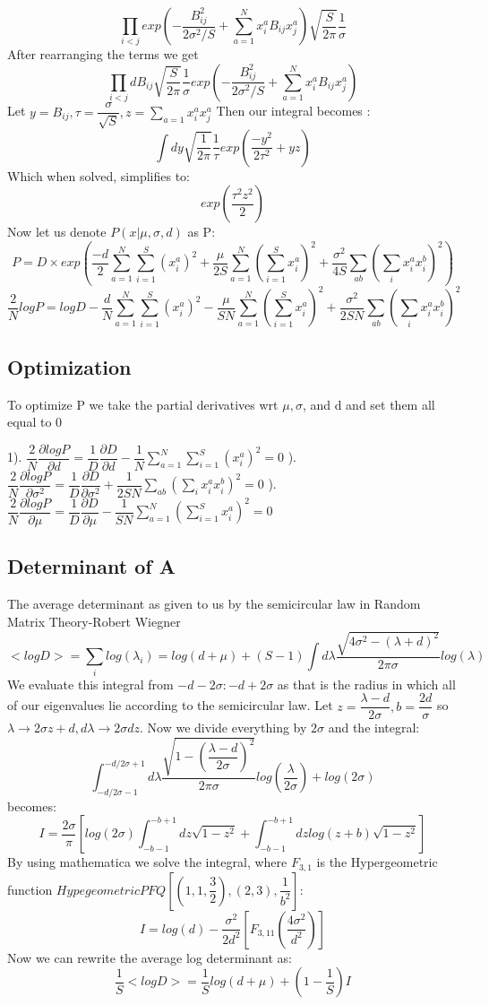 \documentclass{article}
\begin{document}
$$\prod_{i<j} exp(-\dfrac{B_{ij}^2}{2\sigma^2/S}+\sum_{a=1}^N x_i^a B_{ij} x_j^a)\sqrt{\dfrac{S}{2\pi}}\dfrac{1}{\sigma}$$
\hfill\break
After rearranging the terms we get \hfill\break
$$\prod_{i<j} dB_{ij} \sqrt{\dfrac{S}{2\pi}}\dfrac{1}{\sigma}exp(-\dfrac{B_{ij}^2}{2\sigma^2/S}+\sum_{a=1}^N x_i^a B_{ij} x_j^a)$$
Let $y=B_{ij}, \tau=\dfrac{\sigma}{\sqrt{S}}, z=\sum_{a=1} x_i^a x_j^a$
\hfill\break\hfill\break
Then our integral becomes :
$$
\int dy \sqrt{\dfrac{1}{2\pi}}\dfrac{1}{\tau}exp(\dfrac{-y^2}{2\tau ^2}+yz)
$$
Which when solved, simplifies to:
$$
exp(\dfrac{\tau ^2 z^2}{2})
$$
Now let us denote $P(x|\mu,\sigma,d)$ as P:
$$
P=D\times exp(\dfrac{-d}{2}\sum_{a=1}^N\sum_{i=1}^S(x_i^a)^2 + \dfrac{\mu}{2S} \sum_{a=1}^N (\sum_{i=1}^S x_i^a)^2+\dfrac{\sigma^2}{4S}\sum_{ab}(\sum_i x_i^a x_i ^b)^2)
$$
$$
\dfrac{2}{N}logP=logD-\dfrac{d}{N}\sum_{a=1}^N\sum_{i=1}^S(x_i^a)^2 - \dfrac{\mu}{SN} \sum_{a=1}^N (\sum_{i=1}^S x_i^a)^2+\dfrac{\sigma^2}{2SN}\sum_{ab}(\sum_i x_i^a x_i ^b)^2
$$

\subsection{Optimization}
To optimize P we take the partial derivatives wrt $\mu, \sigma$, and d and set them all equal to 0

1). $\dfrac{2}{N}\dfrac{\partial logP}{\partial d}=\dfrac{1}{D}\dfrac{\partial D}{\partial d}-\dfrac{1}{N}\sum_{a=1}^N\sum_{i=1}^S(x_i^a)^2 =0$
\hfill\break\hfill{}). $\dfrac{2}{N}\dfrac{\partial logP}{\partial \sigma^2}=\dfrac{1}{D}\dfrac{\partial D}{\partial \sigma^2}+\dfrac{1}{2SN}\sum_{ab}(\sum_i x_i^a x_i ^b)^2 =0$
\hfill\break\hfill{}). $\dfrac{2}{N}\dfrac{\partial logP}{\partial \mu}=\dfrac{1}{D}\dfrac{\partial D}{\partial \mu}-\dfrac{1}{SN} \sum_{a=1}^N (\sum_{i=1}^S x_i^a)^2 =0$
\hfill\break\hfill\break
\subsection{Determinant of A}
The average determinant as given to us by the semicircular law in Random Matrix Theory-Robert Wiegner 
$$
<log D>=\sum_i log(\lambda_i)=log(d+\mu)+(S-1)\int d\lambda \dfrac{\sqrt{4\sigma^2-(\lambda+d)^2}}{2\pi\sigma}log(\lambda)
$$
We evaluate this integral from $-d-2\sigma : -d+2\sigma$ as that is the radius in which all of our eigenvalues lie according to the semicircular law. Let $z=\dfrac{\lambda -d}{2\sigma}, b=\dfrac{2d}{\sigma}$ so $\lambda \rightarrow 2\sigma z+d, d\lambda \rightarrow 2\sigma dz$. Now we divide everything by $2\sigma$ and the integral:
$$
\int_{-d/2\sigma -1}^{-d/2\sigma +1} d\lambda \dfrac{\sqrt{1-(\dfrac{\lambda -d}{2\sigma})^2}}{2\pi\sigma}log(\dfrac{\lambda}{2\sigma})+log(2\sigma)
$$
becomes:
$$
I=\dfrac{2\sigma}{\pi}[log(2\sigma)\int_{-b-1}^{-b+1}dz\sqrt{1-z^2}+\int_{-b-1}^{-b+1} dz log(z+b)\sqrt{1-z^2}]
$$
By using mathematica we solve the integral, where $F_{3,1}$ is the Hypergeometric function $HypegeometricPFQ[(1,1,\dfrac{3}{2}),(2,3),\dfrac{1}{b^2}]$:
$$
I=log(d)-\dfrac{\sigma^2}{2d^2}[F_{3,11}(\dfrac{4\sigma^2}{d^2})]
$$
Now we can rewrite the average log determinant as:
$$
\dfrac{1}{S}<logD>=\dfrac{1}{S}log(d+\mu)+(1-\dfrac{1}{S})I
$$
\end{document}
